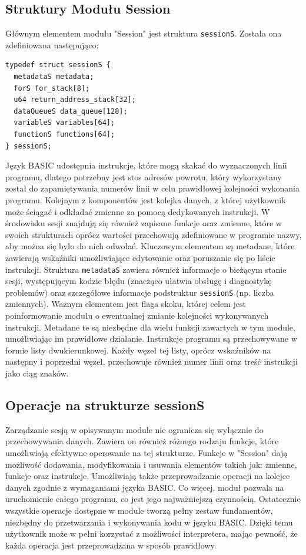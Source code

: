 \documentclass[shortabstract]{iithesis}
\begin{document}
\subsection{Struktury Modułu Session}
Głównym elementem modułu "Session" jest struktura \texttt{sessionS}. Została ona zdefiniowana następująco:
\begin{verbatim}
typedef struct sessionS {
  metadataS metadata;
  forS for_stack[8];
  u64 return_address_stack[32];
  dataQueueS data_queue[128];
  variableS variables[64];
  functionS functions[64];
} sessionS;
\end{verbatim}

Język BASIC udostępnia instrukcje, które mogą skakać do wyznaczonych linii programu, dlatego potrzebny jest stos adresów powrotu, który wykorzystany został do zapamiętywania numerów linii w celu prawidłowej kolejności wykonania programu. Kolejnym z komponentów jest kolejka danych, z której użytkownik może ściągać i odkładać zmienne za pomocą dedykowanych instrukcji. W środowisku sesji znajdują się również zapisane funkcje oraz zmienne, które w swoich strukturach oprócz wartości przechowują zdefiniowane w programie nazwy, aby można się było do nich odwołać. Kluczowym elementem są metadane, które zawierają wskaźniki umożliwiające edytowanie oraz poruszanie się po liście instrukcji. Struktura \texttt{metadataS} zawiera również informacje o bieżącym stanie sesji, występującym kodzie błędu (znacząco ułatwia obsługę i diagnostykę problemów) oraz szczegółowe informacje podstruktur \texttt{sessionS} (np. liczba zmiennych). Ważnym elementem jest flaga skoku, której celem jest poinformowanie modułu o ewentualnej zmianie kolejności wykonywanych instrukcji. Metadane te są niezbędne dla wielu funkcji zawartych w tym module, umożliwiając im prawidłowe działanie.
Instrukcje programu są przechowywane w formie listy dwukierunkowej. Każdy węzeł tej listy, oprócz wskaźników na następny i poprzedni węzeł, przechowuje również numer linii oraz treść instrukcji jako ciąg znaków.
\subsection{Operacje na strukturze sessionS}
Zarządzanie sesją w opisywanym module nie ogranicza się wyłącznie do przechowywania danych. Zawiera on również różnego rodzaju funkcje, które umożliwiają efektywne operowanie na tej strukturze. Funkcje w "Session" dają możliwość dodawania, modyfikowania i usuwania elementów takich jak: zmienne, funkcje oraz instrukcje. Umożliwiają także przeprowadzanie operacji na kolejce danych zgodnie z wymaganiami języka BASIC. Co więcej, moduł pozwala na uruchomienie całego programu, co jest jego najważniejszą czynnością. Ostatecznie wszystkie operacje dostępne w module tworzą pełny zestaw fundamentów, niezbędny do przetwarzania i wykonywania kodu w języku BASIC. Dzięki temu użytkownik może w pełni korzystać z możliwości interpretera, mając pewność, że każda operacja jest przeprowadzana w sposób prawidłowy.
\end{document}
